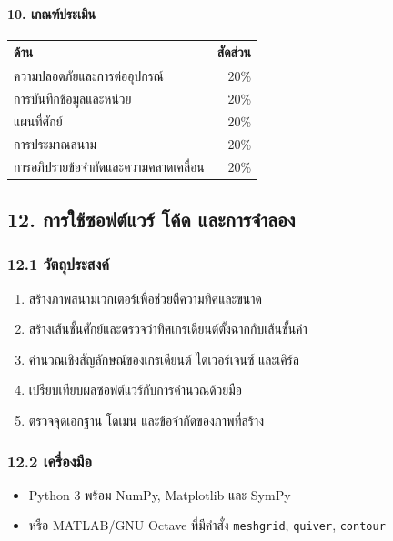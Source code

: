 \paragraph{10. เกณฑ์ประเมิน}

\begin{table}[htbp]
    \centering
    \begin{tabularx}{0.76\textwidth}{Y r}
        \hline
        \textbf{ด้าน} & \textbf{สัดส่วน} \\
        \hline
        ความปลอดภัยและการต่ออุปกรณ์ & 20\% \\
        การบันทึกข้อมูลและหน่วย & 20\% \\
        แผนที่ศักย์ & 20\% \\
        การประมาณสนาม & 20\% \\
        การอภิปรายข้อจำกัดและความคลาดเคลื่อน & 20\% \\
        \hline
    \end{tabularx}
\end{table}

\subsection{12. การใช้ซอฟต์แวร์ โค้ด และการจำลอง}

\subsubsection{12.1 วัตถุประสงค์}

\begin{enumerate}
\item สร้างภาพสนามเวกเตอร์เพื่อช่วยตีความทิศและขนาด
\item สร้างเส้นชั้นศักย์และตรวจว่าทิศเกรเดียนต์ตั้งฉากกับเส้นชั้นค่า
\item คำนวณเชิงสัญลักษณ์ของเกรเดียนต์ ไดเวอร์เจนซ์ และเคิร์ล
\item เปรียบเทียบผลซอฟต์แวร์กับการคำนวณด้วยมือ
\item ตรวจจุดเอกฐาน โดเมน และข้อจำกัดของภาพที่สร้าง
\end{enumerate}

\subsubsection{12.2 เครื่องมือ}

\begin{itemize}
\item Python 3 พร้อม NumPy, Matplotlib และ SymPy
\item หรือ MATLAB/GNU Octave ที่มีคำสั่ง \texttt{meshgrid}, \texttt{quiver}, \texttt{contour}
\end{itemize}

